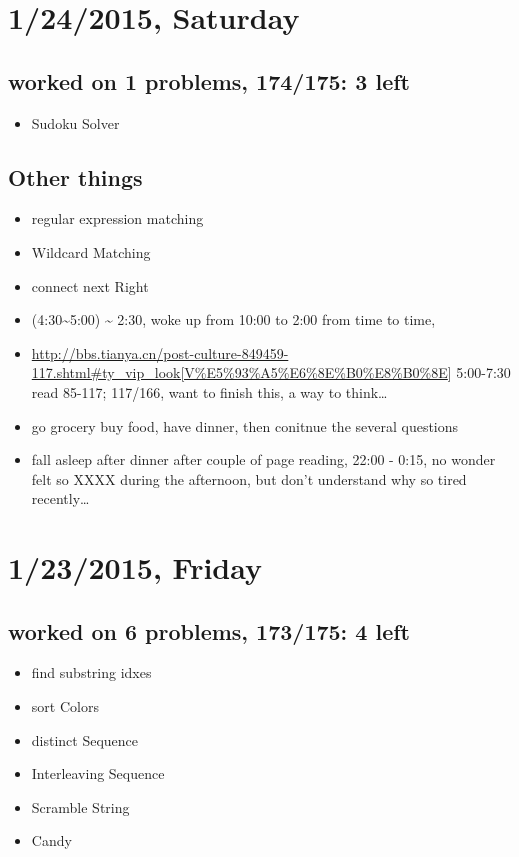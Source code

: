 \documentclass[9pt,b5paper]{article}
\begin{document}
\section{1/24/2015, Saturday}
\label{sec-3}
\subsection{worked on 1 problems, 174/175: 3 left}
\label{sec-3-1}
\begin{itemize}
\item Sudoku Solver
\end{itemize}
\subsection{Other things}
\label{sec-3-2}
\begin{itemize}
\item regular expression matching
\item Wildcard Matching
\item connect next Right
\item (4:30\textasciitilde{}5:00) \textasciitilde{} 2:30, woke up from 10:00 to 2:00 from time to time,
\item \url{http://bbs.tianya.cn/post-culture-849459-117.shtml#ty_vip_look[V\%E5\%93\%A5\%E6\%8E\%B0\%E8\%B0\%8E}] 5:00-7:30 read 85-117; 117/166, want to finish this, a way to think\ldots{}
\item go grocery buy food, have dinner, then conitnue the several questions
\item fall asleep after dinner after couple of page reading, 22:00 - 0:15, no wonder felt so XXXX during the afternoon, but don't understand why so tired recently\ldots{}
\end{itemize}
\section{1/23/2015, Friday}
\label{sec-4}
\subsection{worked on 6 problems, 173/175: 4 left}
\label{sec-4-1}
\begin{itemize}
\item find substring idxes
\item sort Colors
\item distinct Sequence
\item Interleaving Sequence
\item Scramble String
\item Candy
\end{itemize}
\end{document}
